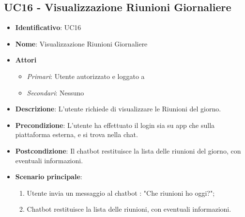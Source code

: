 \subsection{UC16 - Visualizzazione Riunioni Giornaliere }
\begin{itemize}
	\item \textbf{Identificativo}: UC16
	\item \textbf{Nome}: Visualizzazione Riunioni Giornaliere
	\item \textbf{Attori}
	\begin{itemize} 
		\item \textit{Primari}: Utente autorizzato e loggato a 
		\item \textit{Secondari}: Nessuno
	\end{itemize}
	\item \textbf{Descrizione}: L'utente richiede di visualizzare le Riunioni del giorno.
	\item \textbf{Precondizione}: L'utente ha effettuato il login sia su app che sulla piattaforma esterna, e si trova nella chat.
	\item \textbf{Postcondizione}: Il chatbot restituisce la lista delle riunioni del giorno, con eventuali informazioni.
	\item \textbf{Scenario principale}:  \begin{enumerate}
		\item Utente invia un messaggio al chatbot : "Che riunioni ho oggi?";
		\item Chatbot restituisce la lista delle riunioni, con eventuali informazioni.
	\end{enumerate}
\end{itemize}